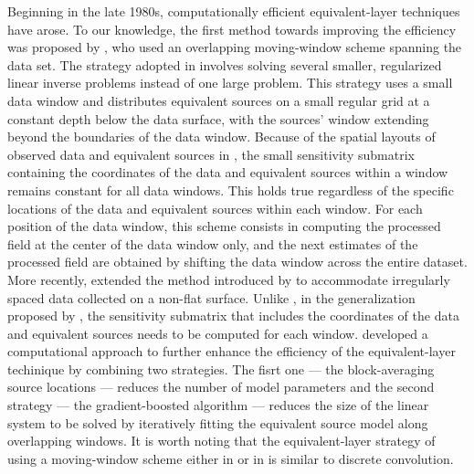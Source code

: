 Beginning in the late 1980s, computationally efficient equivalent-layer techniques have arose. 
To our knowledge, the first method towards improving the efficiency  was proposed by \cite{leao-silva1989}, 
who used an overlapping moving-window scheme spanning the data set. 
The strategy adopted in \cite{leao-silva1989} involves solving several smaller, regularized linear inverse problems instead of one large problem. 
This strategy uses a small data window and distributes equivalent sources 
on a small regular grid at a constant depth below the data surface, with the sources' window extending beyond the boundaries of the data window.
Because of the spatial layouts of observed data and equivalent sources in \cite{leao-silva1989}, the small sensitivity submatrix containing the coordinates of the data and equivalent sources within a window remains constant for all data windows. This holds true regardless  of the specific locations of the data and equivalent sources within each window.
For each position of the data window, this scheme consists in computing the processed field 
at the center of the data window only, and the next estimates of the processed field are 
obtained by shifting the data window across the entire dataset. 
More recently, \cite{soler-uieda2021} extended the method introduced by \cite{leao-silva1989} to accommodate irregularly spaced data collected on a non-flat surface.
Unlike  \cite{leao-silva1989}, in the generalization proposed by \cite{soler-uieda2021}, the sensitivity submatrix that includes the coordinates of the data and equivalent sources needs to be computed for each window.
\cite{soler-uieda2021}  developed a computational approach to further enhance the efficiency of the equivalent-layer techinique by combining two strategies. 
The fisrt one --- the block-averaging source locations --- reduces the number of model parameters and the second strategy --- the gradient-boosted algorithm --- reduces the size of the linear system to be solved by iteratively fitting the equivalent source model  along overlapping windows. 
It is worth noting that the equivalent-layer strategy of using a moving-window scheme either in \cite{leao-silva1989} or in \cite{soler-uieda2021} is similar to discrete convolution.

